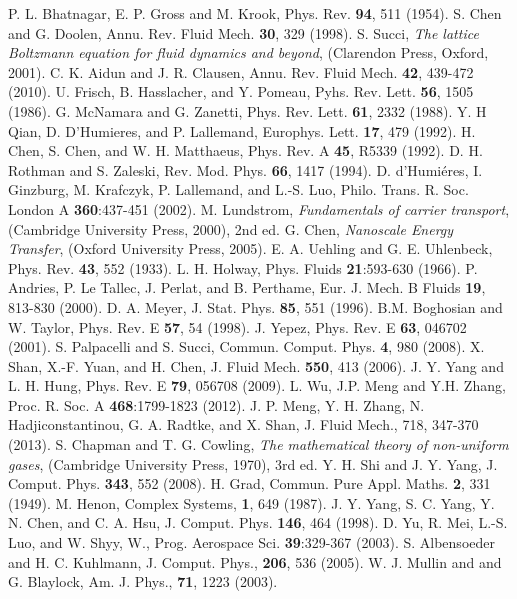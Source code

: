 \documentclass[aip,jmp,amsmath,amssymb,reprint,noshowpacs]{revtex4-1}
\begin{document}
\begin{thebibliography}{0}

 P. L. Bhatnagar, E. P. Gross and M. Krook, Phys. Rev. {\bf 94}, 511 (1954).
 S. Chen and G. Doolen, Annu. Rev. Fluid Mech. {\bf 30}, 329 (1998).
 S. Succi, {\sl The lattice Boltzmann equation for fluid dynamics and beyond}, (Clarendon Press, Oxford, 2001).
 C. K. Aidun and J. R. Clausen, Annu. Rev. Fluid Mech. {\bf 42}, 439-472 (2010).
 U. Frisch, B. Hasslacher, and Y. Pomeau, Pyhs. Rev. Lett. {\bf 56}, 1505 (1986).
 G. McNamara and G. Zanetti, Phys. Rev. Lett. {\bf 61}, 2332 (1988).
 Y. H Qian, D. D'Humieres, and P. Lallemand, Europhys. Lett. {\bf 17}, 479 (1992).
 H. Chen, S. Chen, and W. H. Matthaeus, Phys. Rev. A {\bf 45}, R5339 (1992).
 D. H. Rothman and S. Zaleski, Rev. Mod. Phys. {\bf 66}, 1417 (1994).
 D. d'Humi\'{e}res, I. Ginzburg, M. Krafczyk, P. Lallemand, and L.-S. Luo, Philo. Trans. R. Soc. London A {\bf 360}:437-451 (2002).
 M. Lundstrom, {\sl Fundamentals of carrier transport}, (Cambridge University Press, 2000), 2nd ed.
 G. Chen, {\sl Nanoscale Energy Transfer}, (Oxford University Press, 2005).
 E. A. Uehling and G. E. Uhlenbeck, Phys. Rev. {\bf 43}, 552 (1933).
 L. H. Holway, Phys. Fluids {\bf 21}:593-630 (1966).
 P. Andries, P. Le Tallec, J. Perlat, and B. Perthame, Eur. J. Mech. B Fluids {\bf 19}, 813-830 (2000).
 D. A. Meyer, J. Stat. Phys. {\bf 85}, 551 (1996).
 B.M. Boghosian and W. Taylor, Phys. Rev. E {\bf 57}, 54 (1998).
 J. Yepez, Phys. Rev. E {\bf 63}, 046702 (2001).
 S. Palpacelli and S. Succi, Commun. Comput. Phys. {\bf 4}, 980 (2008).
 X. Shan, X.-F. Yuan, and H. Chen, J. Fluid Mech. {\bf 550}, 413 (2006).
 J. Y. Yang and L. H. Hung, Phys. Rev. E {\bf 79}, 056708 (2009).
 L. Wu, J.P. Meng  and Y.H. Zhang, Proc. R. Soc. A {\bf 468}:1799-1823 (2012).
 J. P. Meng, Y. H. Zhang, N. Hadjiconstantinou, G. A. Radtke, and X. Shan, J. Fluid Mech., 718, 347-370 (2013).
 S. Chapman and  T. G. Cowling, {\sl The mathematical theory of non-uniform gases}, (Cambridge University Press, 1970), 3rd ed.
 Y. H. Shi and J. Y. Yang, J. Comput. Phys. {\bf 343}, 552 (2008).
 H. Grad, Commun. Pure Appl. Maths. {\bf 2}, 331 (1949).
 M. Henon, Complex Systems, {\bf 1}, 649 (1987).
 J. Y. Yang, S. C. Yang, Y. N. Chen, and C. A. Hsu, J. Comput. Phys. {\bf 146}, 464 (1998).
 D. Yu, R. Mei, L.-S. Luo, and W. Shyy, W., Prog. Aerospace Sci. {\bf 39}:329-367 (2003).
 S. Albensoeder and H. C. Kuhlmann, J. Comput. Phys., {\bf 206}, 536 (2005).
 W. J. Mullin and and G. Blaylock, Am. J. Phys., {\bf 71}, 1223 (2003).

\end{thebibliography}
\end{document}
